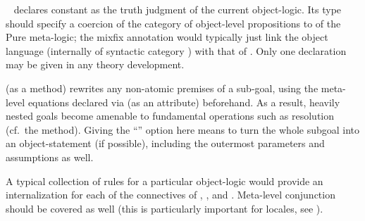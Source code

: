 \begin{isabellebody}
\begin{isamarkuptext}
  \begin{description}
  
  \item \hyperlink{command.judgment}{\mbox{}}~ declares constant
   as the truth judgment of the current object-logic.  Its
  type  should specify a coercion of the category of
  object-level propositions to  of the Pure meta-logic;
  the mixfix annotation  would typically just link the
  object language (internally of syntactic category )
  with that of .  Only one \hyperlink{command.judgment}{\mbox{}}
  declaration may be given in any theory development.
  
  \item \hyperlink{method.atomize}{\mbox{}} (as a method) rewrites any non-atomic
  premises of a sub-goal, using the meta-level equations declared via
  \hyperlink{attribute.atomize}{\mbox{}} (as an attribute) beforehand.  As a result,
  heavily nested goals become amenable to fundamental operations such
  as resolution (cf.\ the \hyperlink{method.Pure.rule}{\mbox{}} method).  Giving the ``'' option here means to turn the whole subgoal into an
  object-statement (if possible), including the outermost parameters
  and assumptions as well.

  A typical collection of \hyperlink{attribute.atomize}{\mbox{}} rules for a particular
  object-logic would provide an internalization for each of the
  connectives of , , and .
  Meta-level conjunction should be covered as well (this is
  particularly important for locales, see ).


\end{description}
\end{isamarkuptext}
\end{isabellebody}
